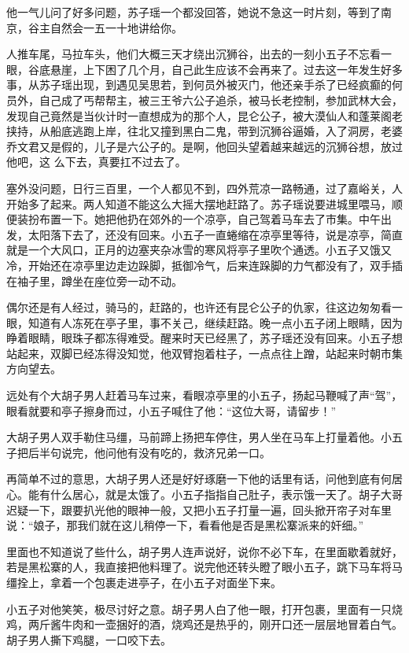 他一气儿问了好多问题，苏子瑶一个都没回答，她说不急这一时片刻，等到了南京，谷主自然会一五一十地讲给你。

人推车尾，马拉车头，他们大概三天才绕出沉狮谷，出去的一刻小五子不忘看一眼，谷底悬崖，上下困了几个月，自己此生应该不会再来了。过去这一年发生好多事，从苏子瑶出现，到遇见吴思若，到何员外被灭门，他还亲手杀了已经疯癫的何员外，自己成了丐帮帮主，被三王爷六公子追杀，被马长老控制，参加武林大会，发现自己竟然是当伙计时一直想成为的那个人，昆仑公子，被大漠仙人和蓬莱阁老挟持，从船底逃跑上岸，往北又撞到黑白二鬼，带到沉狮谷逼婚，入了洞房，老婆乔文君又是假的，儿子是六公子的。是啊，他回头望着越来越远的沉狮谷想，放过他吧，这
么下去，真要扛不过去了。

塞外没问题，日行三百里，一个人都见不到，四外荒凉一路畅通，过了嘉峪关，人开始多了起来。两人知道不能这么大摇大摆地赶路了。苏子瑶说要进城里喂马，顺便装扮布置一下。她把他扔在郊外的一个凉亭，自己驾着马车去了市集。中午出发，太阳落下去了，还没有回来。小五子一直蜷缩在凉亭里等待，说是凉亭，简直就是一个大风口，正月的边塞夹杂冰雪的寒风将亭子里吹个通透。小五子又饿又冷，开始还在凉亭里边走边跺脚，抵御冷气，后来连跺脚的力气都没有了，双手插在袖子里，蹲坐在座位旁一动不动。

偶尔还是有人经过，骑马的，赶路的，也许还有昆仑公子的仇家，往这边匆匆看一眼，知道有人冻死在亭子里，事不关己，继续赶路。晚一点小五子闭上眼睛，因为睁着眼睛，眼珠子都冻得难受。醒来时天已经黑了，苏子瑶还没有回来。小五子想站起来，双脚已经冻得没知觉，他双臂抱着柱子，一点点往上蹭，站起来时朝市集方向望去。

远处有个大胡子男人赶着马车过来，看眼凉亭里的小五子，扬起马鞭喊了声“驾”，眼看就要和亭子擦身而过，小五子喊住了他：“这位大哥，请留步！”

大胡子男人双手勒住马缰，马前蹄上扬把车停住，男人坐在马车上打量着他。小五子把后半句说完，他问他有没有吃的，救济兄弟一口。

再简单不过的意思，大胡子男人还是好好琢磨一下他的话里有话，问他到底有何居心。能有什么居心，就是太饿了。小五子指指自己肚子，表示饿一天了。胡子大哥迟疑一下，跟要扒光他的眼神一般，又把小五子打量一遍，回头掀开帘子对车里说：“娘子，那我们就在这儿稍停一下，看看他是否是黑松寨派来的奸细。”

里面也不知道说了些什么，胡子男人连声说好，说你不必下车，在里面歇着就好，若是黑松寨的人，我直接把他料理了。说完他还转头瞪了眼小五子，跳下马车将马缰拴上，拿着一个包裹走进亭子，在小五子对面坐下来。

小五子对他笑笑，极尽讨好之意。胡子男人白了他一眼，打开包裹，里面有一只烧鸡，两斤酱牛肉和一壶捆好的酒，烧鸡还是热乎的，刚开口还一层层地冒着白气。胡子男人撕下鸡腿，一口咬下去。

